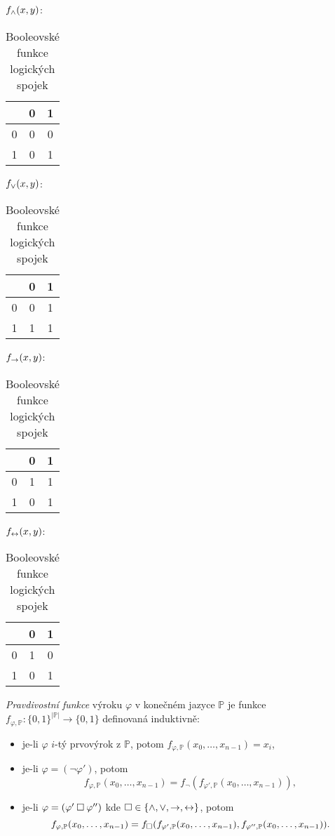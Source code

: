\begin{table}
\centering
$f_{\land}(x,y)$:  
\begin{tabular}{c|cc}
      & 0 & 1  \\ \hline
    0 & 0 & 0  \\
    1 & 0 & 1 
\end{tabular}\quad
$f_{\lor}(x,y)$:         
\begin{tabular}{c|cc}
      & 0 & 1  \\ \hline
    0 & 0 & 1  \\
    1 & 1 & 1 
\end{tabular}\quad
$f_{\mathbin{\rightarrow}}(x,y)$:         
\begin{tabular}{c|cc}
      & 0 & 1  \\ \hline
    0 & 1 & 1  \\
    1 & 0 & 1 
\end{tabular}\quad
$f_{\mathbin{\leftrightarrow}}(x,y)$:         
\begin{tabular}{c|cc}
      & 0 & 1  \\ \hline
    0 & 1 & 0  \\
    1 & 0 & 1 
\end{tabular}
\caption{Booleovské funkce logických spojek}
\label{table:boolean-functions-for-logical-connectives}    
\end{table}

\begin{definition}\label{definition:truth-function}
\emph{Pravdivostní funkce} výroku $\varphi$ v konečném jazyce $\mathbb P$ je funkce  $f_{\varphi,\mathbb P}\colon\{0,1\}^{|\mathbb P|}\to\{0,1\}$ definovaná induktivně:
\begin{itemize}
    \item je-li $\varphi$ $i$-tý prvovýrok z $\mathbb P$, potom $f_{\varphi,\mathbb P}(x_0,\dots,x_{n-1})=x_i$,
    \item je-li $\varphi=(\neg\varphi')$, potom 
    $$
    f_{\varphi,\mathbb P}(x_0,\dots,x_{n-1})=f_\neg(f_{\varphi',\mathbb P}(x_0,\dots,x_{n-1})),$$
    \item je-li $\varphi=(\varphi'\mathbin{\square}\varphi'')$ kde ${\mathbin{\square}}\in\{{\land},{\lor},{\mathbin{\rightarrow}},{\mathbin{\leftrightarrow}}\}$, potom 
    $$
    f_{\varphi,\mathbb P}(x_0,\dots,x_{n-1})=f_{\mathbin{\square}}(f_{\varphi',\mathbb P}(x_0,\dots,x_{n-1}), f_{\varphi'',\mathbb P}(x_0,\dots,x_{n-1})).
    $$
\end{itemize}
\end{definition}

